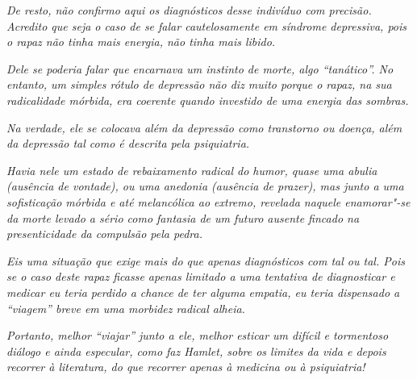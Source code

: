\emph{De resto, não confirmo aqui os diagnósticos desse indivíduo com
precisão. Acredito que seja o caso de se falar cautelosamente em
síndrome depressiva, pois o rapaz não tinha mais energia, não tinha mais
libido.}

\emph{Dele se poderia falar que encarnava um instinto de morte, algo
``tanático''. No entanto, um simples rótulo de depressão não diz muito
porque o rapaz, na sua radicalidade mórbida, era coerente quando
investido de uma energia das sombras.}

\emph{Na verdade, ele se colocava além da depressão como transtorno ou
doença, além da depressão tal como é descrita pela psiquiatria.}

\emph{Havia nele um estado de rebaixamento radical do humor, quase uma
abulia (ausência de vontade), ou uma anedonia (ausência de prazer), mas
junto a uma sofisticação mórbida e até melancólica ao extremo, revelada
naquele enamorar"-se da morte levado a sério como fantasia de um futuro
ausente fincado na presenticidade da compulsão pela pedra.}

\emph{Eis uma situação que exige mais do que apenas diagnósticos com 
tal ou  tal. Pois se o caso deste rapaz ficasse apenas limitado a uma
tentativa de diagnosticar e medicar eu teria perdido a chance de ter
alguma empatia, eu teria dispensado a ``viagem'' breve em uma morbidez
radical alheia.}

\emph{Portanto, melhor ``viajar'' junto a ele, melhor esticar um difícil
e tormentoso diálogo e ainda especular, como faz Hamlet, sobre os
limites da vida e depois recorrer à literatura, do que recorrer apenas à
medicina ou à psiquiatria!}
